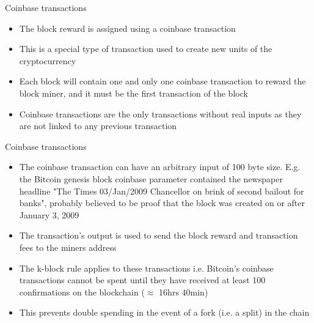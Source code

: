 \documentclass[9pt]{beamer}
\begin{document}

\begin{frame}{Coinbase transactions}
	\begin{itemize}
		\item The block reward is assigned using a coinbase transaction
		\item This is a special type of transaction used to create new units of the cryptocurrency
		\item Each block will contain one and only one coinbase transaction to reward the block miner, and it must be the first transaction of the block
		\item Coinbase transactions are the only transactions without real inputs as they are not linked to any previous transaction
	\end{itemize}
\end{frame}


\begin{frame}{Coinbase transactions}
	\begin{itemize}
		\item The coinbase transaction can have an arbitrary input of 100 byte size. E.g. the Bitcoin genesis block coinbase parameter contained the newspaper  headline "The Times 03/Jan/2009 Chancellor on brink of second bailout for banks", probably believed to be proof that the block was created on or after January 3, 2009
		\item The transaction's output is used to send the block reward and transaction fees to the miners address
		\item The k-block rule applies to these transactions i.e. Bitcoin's coinbase transactions cannot be spent until they have received at least 100 confirmations on the blockchain ($\approx$ 16hrs 40min)
		\item This prevents double spending in the event of a fork (i.e. a split) in the chain
	\end{itemize}
\end{frame}

\end{document}

